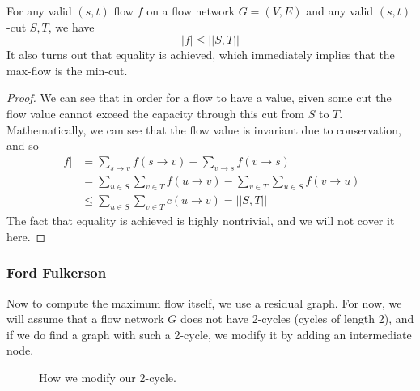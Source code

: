     \begin{theorem}
      For any valid $(s, t)$ flow $f$ on a flow network $G = (V, E)$ and any valid $(s, t)$-cut $S, T$, we have 
      \begin{equation}
        |f| \leq ||S, T||
      \end{equation} 
      It also turns out that equality is achieved, which immediately implies that the max-flow is the min-cut. 
    \end{theorem}
    \begin{proof}
      We can see that in order for a flow to have a value, given some cut the flow value cannot exceed the capacity through this cut from $S$ to $T$. Mathematically, we can see that the flow value is invariant due to conservation, and so  
      \begin{align}
        |f| & = \sum_{s \rightarrow v} f(s \rightarrow v) - \sum_{v \rightarrow s} f(v \rightarrow s) \\ 
            & = \sum_{u \in S} \sum_{v \in T} f(u \rightarrow v) - \sum_{v \in T} \sum_{u \in S} f(v \rightarrow u) \\ 
            & \leq \sum_{u \in S} \sum_{v \in T} c(u \rightarrow v) = ||S, T||
      \end{align}
      The fact that equality is achieved is highly nontrivial, and we will not cover it here. 
    \end{proof} 

\subsubsection{Ford Fulkerson}

  Now to compute the maximum flow itself, we use a residual graph. For now, we will assume that a flow network $G$ does not have 2-cycles (cycles of length 2), and if we do find a graph with such a 2-cycle, we modify it by adding an intermediate node. 

  \begin{figure}[H]
    \centering 
    \caption{How we modify our 2-cycle.} 
    \label{fig:cycle_mod}
  \end{figure}

